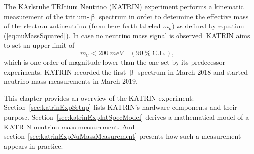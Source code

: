 The KArlsruhe TRItium Neutrino (KATRIN) experiment performs a kinematic measurement of the tritium-$\upbeta$ spectrum in order to determine the effective mass of the electron antineutrino (from here forth labeled $m_\upnu$) as defined by equation (\ref{eq:nuMassSquared}). In case no neutrino mass signal is observed, KATRIN aims to set an upper limit of
\begin{equation*}
m_\upnu < \SI{200}{meV} \quad (\SI{90}{\percent} \text{ C.L.})
\comma
\end{equation*}
which is one order of magnitude lower than the one set by its predecessor experiments.
KATRIN recorded the first $\upbeta$ spectrum in March 2018 and started neutrino mass measurements in March 2019.

This chapter provides an overview of the KATRIN experiment: Section~\ref{sec:katrinExpSetup} lists KATRIN's hardware components and their purpose. Section~\ref{sec:katrinExpIntSpecModel} derives a mathematical model of a KATRIN neutrino mass measurement. And section~\ref{sec:katrinExpNuMassMeasurement} presents how such a measurement appears in practice.
